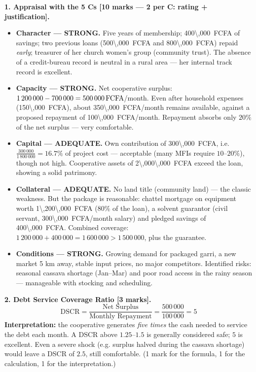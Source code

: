 \documentclass[11pt]{article}
\begin{document}
\begin{corrige}

\textbf{1. Appraisal with the 5 Cs [10 marks — 2 per C: rating + justification].}

\begin{itemize}
\item \textbf{Character — STRONG.} Five years of membership; \SI{400\,000}{FCFA} of savings; two previous loans (\SI{500\,000}{FCFA} and \SI{800\,000}{FCFA}) repaid \emph{early}; treasurer of her church women's group (community trust). The absence of a credit-bureau record is neutral in a rural area — her internal track record is excellent.

\item \textbf{Capacity — STRONG.} Net cooperative surplus: $1\,200\,000 - 700\,000 = \SI{500\,000}{FCFA}$/month. Even after household expenses (\SI{150\,000}{FCFA}), about \SI{350\,000}{FCFA}/month remains available, against a proposed repayment of \SI{100\,000}{FCFA}/month. Repayment absorbs only $20\%$ of the net surplus — very comfortable.

\item \textbf{Capital — ADEQUATE.} Own contribution of \SI{300\,000}{FCFA}, i.e. $\frac{300\,000}{1\,800\,000} = 16.7\%$ of project cost — acceptable (many MFIs require $10$--$20\%$), though not high. Cooperative assets of \SI{2\,000\,000}{FCFA} exceed the loan, showing a solid patrimony.

\item \textbf{Collateral — ADEQUATE.} No land title (community land) — the classic weakness. But the package is reasonable: chattel mortgage on equipment worth \SI{1\,200\,000}{FCFA} ($80\%$ of the loan), a solvent guarantor (civil servant, \SI{300\,000}{FCFA}/month salary) and pledged savings of \SI{400\,000}{FCFA}. Combined coverage: $1\,200\,000 + 400\,000 = 1\,600\,000 > 1\,500\,000$, plus the guarantee.

\item \textbf{Conditions — STRONG.} Growing demand for packaged garri, a new market 5 km away, stable input prices, no major competitors. Identified risks: seasonal cassava shortage (Jan--Mar) and poor road access in the rainy season — manageable with stocking and scheduling.
\end{itemize}

\textbf{2. Debt Service Coverage Ratio [3 marks].}
\[
\text{DSCR} = \frac{\text{Net Surplus}}{\text{Monthly Repayment}} = \frac{500\,000}{100\,000} = 5
\]
\textbf{Interpretation:} the cooperative generates \emph{five times} the cash needed to service the debt each month. A DSCR above $1.25$--$1.5$ is generally considered safe; $5$ is excellent. Even a severe shock (e.g. surplus halved during the cassava shortage) would leave a DSCR of $2.5$, still comfortable. (1 mark for the formula, 1 for the calculation, 1 for the interpretation.)


\end{corrige}
\end{document}
